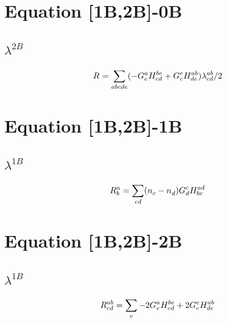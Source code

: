 \documentclass{scrartcl}
\begin{document}
    
\section{Equation [1B,2B]-0B}
\subsection{$\lambda^{2B}$}
\begin{dmath*}
R^{}_{} = \sum_{abcde} (-G^{a}_{e} \* H^{be}_{cd}+G^{e}_{c} \* H^{ab}_{de}) \* \lambda^{ab}_{cd}/2
\end{dmath*}
\section{Equation [1B,2B]-1B}
\subsection{$\lambda^{1B}$}
\begin{dmath*}
R^{a}_{b} = \sum_{cd} (n^{}_{c}-n^{}_{d}) \* G^{c}_{d} \* H^{ad}_{bc}
\end{dmath*}
\section{Equation [1B,2B]-2B}
\subsection{$\lambda^{1B}$}
\begin{dmath*}
R^{ab}_{cd} = \sum_{e} -2 \* G^{a}_{e} \* H^{be}_{cd}+2 \* G^{e}_{c} \* H^{ab}_{de}
\end{dmath*}
\end{document}
